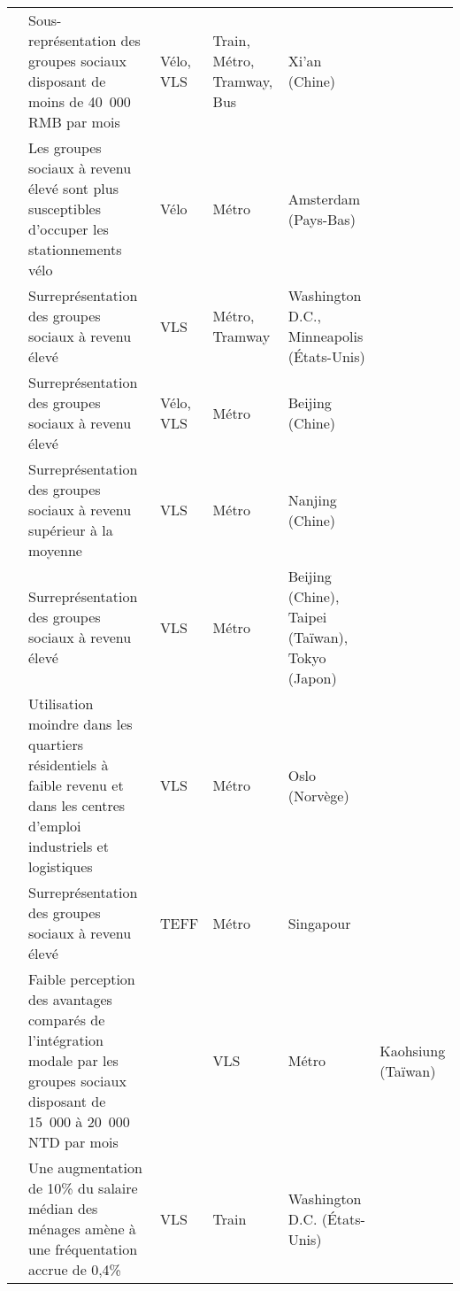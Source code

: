 \begin{longtable}{p{3cm}p{4cm}p{1.5cm}p{1.8cm}p{2.3cm}}
    \small{\textcite{yang_bike-and-ride_2014}} & \small{Sous-représentation des groupes sociaux disposant de moins de 40~000 RMB par mois} & \small{Vélo, VLS} & \small{Train, Métro, Tramway, Bus} & \small{Xi'an (Chine)}\\
    \small{\textcite{kampen_bicycle_2021}} & \small{Les groupes sociaux à revenu élevé sont plus susceptibles d'occuper les stationnements vélo} & \small{Vélo} & \small{Métro} & \small{Amsterdam (Pays-Bas)}\\
    \small{\textcite{martin_evaluating_2014}} & \small{Surreprésentation des groupes sociaux à revenu élevé} & \small{VLS} & \small{Métro, Tramway} & \small{Washington D.C., Minneapolis (États-Unis)}\\  
    \small{\textcite{zhao_bicycle-metro_2017}} & \small{Surreprésentation des groupes sociaux à revenu élevé} & \small{Vélo, VLS} & \small{Métro} & \small{Beijing (Chine)}\\ 
    \small{\textcite{yang_empirical_2016}} & \small{Surreprésentation des groupes sociaux à revenu supérieur à la moyenne} & \small{VLS} & \small{Métro} & \small{Nanjing (Chine)}\\  
    \small{\textcite{lin_built_2018}} & \small{Surreprésentation des groupes sociaux à revenu élevé} & \small{VLS} & \small{Métro} & \small{Beijing (Chine), Taipei (Taïwan), Tokyo (Japon)}\\ 
    \small{\textcite{bocker_bike_2020}} & \small{Utilisation moindre dans les quartiers résidentiels à faible revenu et dans les centres d'emploi industriels et logistiques} & \small{VLS} & \small{Métro} & \small{Oslo (Norvège)}\\
    \small{\textcite{cao_e-scooter_2021}} & \small{Surreprésentation des groupes sociaux à revenu élevé} & \small{TEFF} & \small{Métro} & \small{Singapour}\\ 
    \small{\textcite{cheng_expanding_2018}} & \small{Faible perception des avantages comparés de l'intégration modale par les groupes sociaux disposant de 15~000 à 20~000 NTD par mois} & \small{} & \small{VLS} & \small{Métro} & \small{Kaohsiung (Taïwan)}\\
    \small{\textcite{ma_bicycle_2015}} & \small{Une augmentation de 10\% du salaire médian des ménages amène à une fréquentation accrue de 0,4\%} & \small{VLS} & \small{Train} & \small{Washington D.C. (États-Unis)}\\

\end{longtable}

